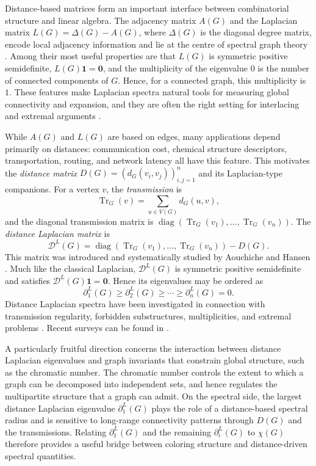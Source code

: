 \documentclass[12pt]{article}
\newcommand{\DL}{\mathcal{D}^{L}}
\newcommand{\Tr}{\operatorname{Tr}}
\theoremstyle{plain}
\theoremstyle{definition}
\begin{document}
Distance-based matrices form an important interface between combinatorial structure and linear algebra. The adjacency matrix
$A(G)$ and the Laplacian matrix $L(G)=\Delta(G)-A(G)$, where $\Delta(G)$ is the diagonal degree matrix, encode local adjacency
information and lie at the centre of spectral graph theory \cite{BrouwerHaemers2012,CvetkovicDoobSachs1995}. Among their
most useful properties are that $L(G)$ is symmetric positive semidefinite, $L(G)\mathbf{1}=\mathbf{0}$, and the multiplicity
of the eigenvalue $0$ is the number of connected components of $G$. Hence, for a connected graph, this multiplicity is $1$.
These features make Laplacian spectra natural tools for measuring global connectivity and expansion, and they are often the
right setting for interlacing and extremal arguments \cite{BrouwerHaemers2012,CvetkovicDoobSachs1995}.

While $A(G)$ and $L(G)$ are based on edges, many applications depend primarily on distances: communication cost, chemical
structure descriptors, transportation, routing, and network latency all have this feature. This motivates the \emph{distance
matrix} $D(G)=(d_G(v_i,v_j))_{i,j=1}^n$ and its Laplacian-type companions. For a vertex $v$, the \emph{transmission} is
\[
    \Tr_G(v)=\sum_{u\in V(G)} d_G(u,v),
\]
and the diagonal transmission matrix is
$\operatorname{diag}(\Tr_G(v_1),\dots,\Tr_G(v_n))$. The \emph{distance Laplacian matrix} is
\[
    \DL(G)=\operatorname{diag}(\Tr_G(v_1),\dots,\Tr_G(v_n))-D(G).
\]
This matrix was introduced and systematically studied by Aouchiche and Hansen \cite{AouchicheHansen2013}. Much like the
classical Laplacian, $\DL(G)$ is symmetric positive semidefinite and satisfies $\DL(G)\mathbf{1}=\mathbf{0}$. Hence its
eigenvalues may be ordered as
\[
    \partial^{L}_1(G)\ge \partial^{L}_2(G)\ge \cdots \ge \partial^{L}_n(G)=0.
\]
Distance Laplacian spectra have been investigated in connection with transmission regularity, forbidden substructures,
multiplicities, and extremal problems
\cite{AouchicheHansen2013,AouchicheHansen2014,LinWuChenShu2016,NathPaul2014,FernandesEtAl2018,NiuFanWang2015,bilalMV}.
Recent surveys can be found in \cite{BilalsurveyDL,BilalsurveyDSL}.

A particularly fruitful direction concerns the interaction between distance Laplacian eigenvalues and graph invariants that
constrain global structure, such as the chromatic number. The chromatic number controls the extent to which a graph can be
decomposed into independent sets, and hence regulates the multipartite structure that a graph can admit. On the spectral side,
the largest distance Laplacian eigenvalue $\partial^{L}_1(G)$ plays the role of a distance-based spectral radius and is sensitive
to long-range connectivity patterns through $D(G)$ and the transmissions. Relating $\partial^{L}_1(G)$ and the remaining
$\partial^{L}_i(G)$ to $\chi(G)$ therefore provides a useful bridge between coloring structure and distance-driven spectral
quantities.
\end{document}
